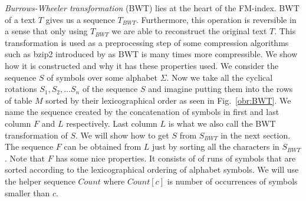 \textit{Burrows-Wheeler transformation} (BWT) lies at the heart of the FM-index.
BWT of a text $T$ gives us a sequence $T_{BWT}$. Furthermore, this
operation is reversible in a sense that only using $T_{BWT}$ we are able to reconstruct the
original text $T$. This transformation is used as a preprocessing step of some compression
algorithms such as bzip2 introduced by \cite{seward1996bzip2} as BWT is many times more
compressible. We show how it is constructed and why it has these properties used. We consider
the sequence $S$ of symbols over
some alphabet $\Sigma$. Now we take all the cyclical rotations $S_1, S_2, \ldots S_n$ of the
sequence $S$ and imagine putting them into the rows of table $M$ sorted by their lexicographical
order as seen in Fig.~\ref{obr:BWT}. We name the sequence created by the concatenation of symbols
in first and last column $F$ and $L$ respectively. Last column $L$ is what we also call
the BWT transformation of $S$. We will show how to get $S$ from $S_{BWT}$ in the next section. The sequence $F$ can
be obtained from $L$ just by sorting all the characters in $S_{BWT}$. Note that $F$ has some
nice properties. It consists of of runs of symbols that are sorted according to the lexicographical
ordering of alphabet symbols. We will use the helper sequence $Count$ where $Count[c]$ is
number of occurrences of symbols smaller than $c$.

